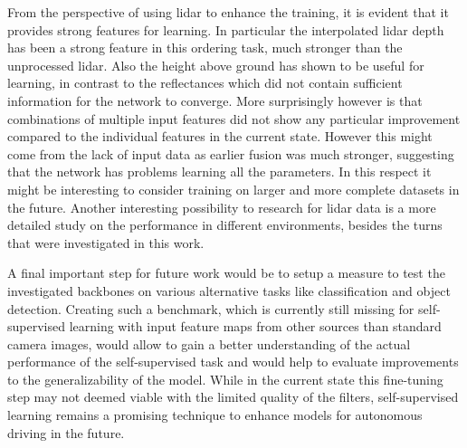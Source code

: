 From the perspective of using lidar to enhance the training, it is evident that it provides strong features for learning. In particular the interpolated lidar depth has been a strong feature in this ordering task, much stronger than the unprocessed lidar. Also the height above ground has shown to be useful for learning, in contrast to the reflectances which did not contain sufficient information for the network to converge. More surprisingly however is that combinations of multiple input features did not show any particular improvement compared to the individual features in the current state. However this might come from the lack of input data as earlier fusion was much stronger, suggesting that the network has problems learning all the parameters. In this respect it might be interesting to consider training on larger and more complete datasets in the future. Another interesting possibility to research for lidar data is a more detailed study on the performance in different environments, besides the turns that were investigated in this work.


A final important step for future work would be to setup a measure to test the investigated backbones on various alternative tasks like classification and object detection. Creating such a benchmark, which is currently still missing for self-supervised learning with input feature maps from other sources than standard camera images, would allow to gain a better understanding of the actual performance of the self-supervised task and would help to evaluate improvements to the generalizability of the model. While in the current state this fine-tuning step may not deemed viable with the limited quality of the filters, self-supervised learning remains a promising technique to enhance models for autonomous driving in the future.

